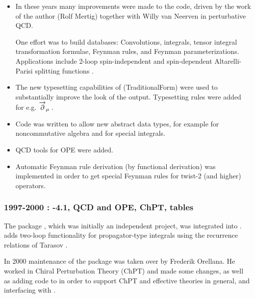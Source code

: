 \begin{itemize}

\item
In these years many improvements were made to the code, driven by the work of the author
(Rolf Mertig) together with Willy van Neerven in perturbative QCD.

One effort was to build databases: Convolutions, integrals, tensor integral transformation
formulae, Feynman rules,
and Feynman parameterizations. 
Applications include 2-loop spin-independent and spin-dependent Altarelli-Parisi splitting
functions \cite{Altarelli:1977zs}.

\item The new typesetting capabilities of  (TraditionalForm) were used to substantially
improve the look of the output.
Typesetting rules were added for e.g. \({\overvar{\partial }{\rightarrow}}_{\mu } \multsp \).

\item Code was written to allow new abstract data types, for example for noncommutative algebra
and for special integrals.

\item QCD tools for OPE were added.

\item Automatic Feynman rule derivation (by functional
derivation) was implemented in order to get special Feynman rules
for twist-2 (and higher) operators.

\end{itemize}

\subsubsection*{1997-2000 : -4.1, QCD and OPE, ChPT, tables}

The package \tarcer, which was initially an independent project, was integrated
into \fc.  \tarcer \cite{Mertig:1998vk} adds two-loop functionality for propagator-type integrals
using the recurrence relations of Tarasov \cite{Tarasov:1997kx}.

In 2000 maintenance of the package was taken over by Frederik Orellana.
He worked in Chiral Perturbation Theory \cite{Gasser:1984gg} (ChPT) and made some changes, as well
as adding code to \fc in order to support ChPT and effective theories in general, and interfacing
with \fa.
